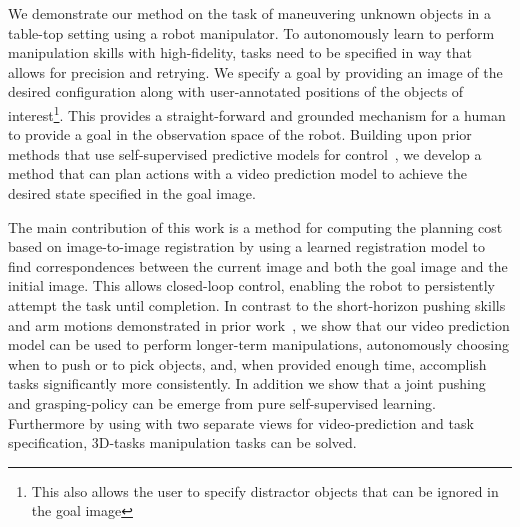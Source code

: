 We demonstrate our method on the task of maneuvering unknown objects in a table-top setting using a robot manipulator. To autonomously learn to perform manipulation skills with high-fidelity, tasks need to be specified in way that allows for precision and retrying. We specify a goal by providing an image of the desired configuration along with user-annotated positions of the objects of interest\footnote{This also allows the user to specify distractor objects that can be ignored in the goal image}. This provides a straight-forward and grounded mechanism for a human to provide a goal in the observation space of the robot.
Building upon prior methods that use self-supervised predictive models for control~\cite{foresight,sna,se3_control}, we develop a method that can plan actions with a video prediction model to achieve the desired state specified in the goal image.

The main contribution of this work is a method for computing the planning cost based on image-to-image registration by using a learned registration model to find correspondences  between the current image and both the goal image and the initial image.
This allows closed-loop control, enabling the robot to persistently attempt the task until completion. In contrast to the short-horizon pushing skills and arm motions demonstrated in prior work~\cite{foresight,sna,se3_control}, we show that our video prediction model can be used to perform longer-term manipulations, autonomously choosing when to push or to  pick objects, and, when provided enough time, accomplish tasks significantly more consistently.
In addition we show that a joint pushing and grasping-policy can be emerge from pure self-supervised learning. Furthermore by using with two separate views for video-prediction and task specification, 3D-tasks manipulation tasks can be solved.


